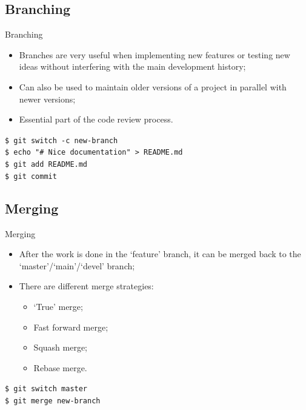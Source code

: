 \documentclass{beamer}
\begin{document}
\subsection{Branching}
\begin{frame}{Branching}
  \begin{itemize}
    \item Branches are very useful when implementing new features or testing new ideas without interfering with the main development history;
    \item Can also be used to maintain older versions of a project in parallel with newer versions;
    \item Essential part of the code review process.
  \end{itemize}
  \begin{block}{}
    \texttt{\$ git switch -c new-branch} \\
    \texttt{\$ echo "\# Nice documentation" > README.md} \\
    \texttt{\$ git add README.md} \\
    \texttt{\$ git commit}
  \end{block}
\end{frame}

\subsection{Merging}
\begin{frame}{Merging}
  \begin{itemize}
    \item After the work is done in the `feature' branch, it can be merged back to the `master'/`main'/`devel' branch;
    \item There are different merge strategies:
    \begin{itemize}
      \item `True' merge;
      \item Fast forward merge;
      \item Squash merge;
      \item Rebase merge.
    \end{itemize}
  \end{itemize}
  \begin{block}{}
    \texttt{\$ git switch master} \\
    \texttt{\$ git merge new-branch}
  \end{block}
\end{frame}
\end{document}
